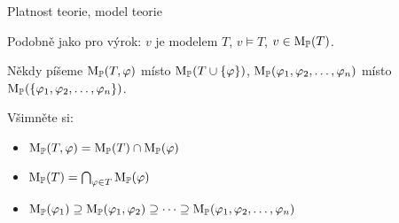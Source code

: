 \documentclass{beamer}
\begin{document}
\begin{frame}{Platnost teorie, model teorie}

    Podobně jako pro výrok: $v$ je \alert{modelem} $T$, \alert{$v\models T$}, \alert{$v\in\operatorname{M}_\mathbb P(T)$}.

    Někdy píšeme $\operatorname{M}_\mathbb P(T,\varphi)$ místo $\operatorname{M}_\mathbb P(T\cup\{\varphi\})$, $\operatorname{M}_\mathbb P(\varphi_1,\varphi_2,\dots,\varphi_n)$ místo $\operatorname{M}_\mathbb P(\{\varphi_1,\varphi_2,\dots,\varphi_n\})$.

    Všimněte si:
    \begin{itemize}
        \item $\operatorname{M}_\mathbb P(T,\varphi)=\operatorname{M}_\mathbb P(T)\cap\operatorname{M}_\mathbb P(\varphi)$
        \item $\operatorname{M}_\mathbb P(T)=\bigcap_{\varphi\in T}\operatorname{M}_\mathbb P(\varphi)$
        \item $
        \operatorname{M}_\mathbb P(\varphi_1)\supseteq \operatorname{M}_\mathbb P(\varphi_1,\varphi_2)\supseteq\dots\supseteq\operatorname{M}_\mathbb P(\varphi_1,\varphi_2,\dots,\varphi_n)
        $
    \end{itemize}


\end{frame}
\end{document}
